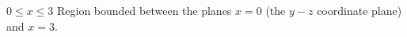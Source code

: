 {$0\leq x\leq 3$
}
{Region bounded between the planes $x=0$ (the $y-z$ coordinate plane) and $x=3$.
}
